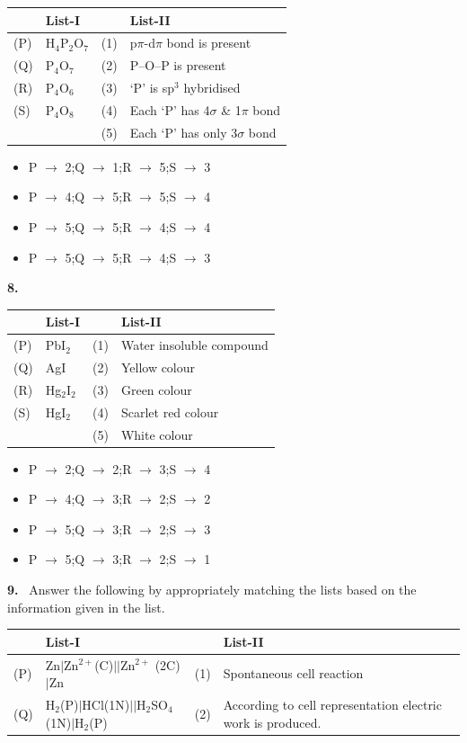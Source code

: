 \documentclass[10pt]{extarticle}
\newcommand{\qn}[1]{\par\smallskip\noindent\textbf{#1.}~}
\newenvironment{qoptions}{\begin{itemize}[leftmargin=1.8em,itemsep=1pt,topsep=2pt,label={}]}{\end{itemize}}
\newcommand{\opt}[2]{\item[(#1)] #2}
\begin{document}
\begin{multicols}{2}
\begin{center}
\begin{tabular}{|L{0.6cm}L{1.9cm}|L{0.6cm}L{3.4cm}|}
&List-I&&List-II\\\hline
(P)&H$_4$P$_2$O$_7$&(1)&p$\pi$-d$\pi$ bond is present\\\hline
(Q)&P$_4$O$_7$&(2)&P--O--P is present\\\hline
(R)&P$_4$O$_6$&(3)&`P' is sp$^3$ hybridised\\\hline
(S)&P$_4$O$_8$&(4)&Each `P' has 4$\sigma$ \& 1$\pi$ bond\\\hline
&&(5)&Each `P' has only 3$\sigma$ bond\\\hline
\end{tabular}\end{center}
\begin{qoptions}
\opt{A}{P $\to$ 2;Q $\to$ 1;R $\to$ 5;S $\to$ 3}
\opt{B}{P $\to$ 4;Q $\to$ 5;R $\to$ 5;S $\to$ 4}
\opt{C}{P $\to$ 5;Q $\to$ 5;R $\to$ 4;S $\to$ 4}
\opt{D}{P $\to$ 5;Q $\to$ 5;R $\to$ 4;S $\to$ 3}
\end{qoptions}
\qn{8} \begin{center}\footnotesize\setlength{\tabcolsep}{2pt}
\begin{tabular}{|L{0.6cm}L{1.4cm}|L{0.6cm}L{3.3cm}|}\hline
&List-I&&List-II\\\hline
(P)&PbI$_2$&(1)&Water insoluble compound\\\hline
(Q)&AgI&(2)&Yellow colour\\\hline
(R)&Hg$_2$I$_2$&(3)&Green colour\\\hline
(S)&HgI$_2$&(4)&Scarlet red colour\\\hline
&&(5)&White colour\\\hline
\end{tabular}\end{center}
\begin{qoptions}
\opt{A}{P $\to$ 2;Q $\to$ 2;R $\to$ 3;S $\to$ 4}
\opt{B}{P $\to$ 4;Q $\to$ 3;R $\to$ 2;S $\to$ 2}
\opt{C}{P $\to$ 5;Q $\to$ 3;R $\to$ 2;S $\to$ 3}
\opt{D}{P $\to$ 5;Q $\to$ 3;R $\to$ 2;S $\to$ 1}
\end{qoptions}
\qn{9} Answer the following by appropriately matching the lists based on the information given in the list.
\begin{center}\footnotesize\setlength{\tabcolsep}{2pt}
\begin{tabular}{|L{0.6cm}L{3.0cm}|L{0.6cm}L{2.7cm}|}\hline
&List-I&&List-II\\\hline
(P)&Zn$|$\allowbreak Zn$^{2+}$(C)$||$\allowbreak Zn$^{2+}$ (2C)$|$\allowbreak Zn&(1)&Spontaneous cell reaction\\\hline
(Q)&H$_2$(P)$|$\allowbreak HCl(1N)$||$\allowbreak H$_2$SO$_4$(1N)$|$\allowbreak H$_2$(P)&(2)&According to cell representation electric work is produced.\\\hline

\end{tabular}
\end{center}
\end{multicols}
\end{document}
